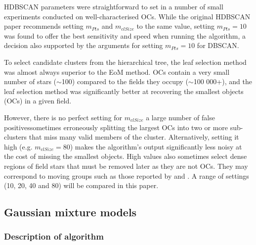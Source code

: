 HDBSCAN parameters were straightforward to set in a number of small experiments conducted on well-characterised OCs. While the original HDBSCAN paper recommends setting $m_{Pts}$ and $m_{clSize}$ to the same value, setting $m_{Pts}=10$ was found to offer the best sensitivity and speed when running the algorithm, a decision also supported by the arguments for setting $m_{Pts}=10$ for DBSCAN.

To select candidate clusters from the hierarchical tree, the leaf selection method was almost always superior to the EoM method. OCs contain a very small number of stars ($\sim$100) compared to the fields they occupy ($\sim$100 000+), and the leaf selection method was significantly better at recovering the smallest objects (OCs) in a given field.

However, there is no perfect setting for $m_{clSize}$ a large number of false positivessometimes erroneously splitting the largest OCs into two or more sub-clusters that miss many valid members of the cluster. Alternatively, setting it high (e.g. $m_{clSize}=80$) makes the algorithm's output significantly less noisy at the cost of missing the smallest objects. High values also sometimes select dense regions of field stars that must be removed later as they are not OCs.  They may correspond to moving groups such as those reported by \cite{kounkel_untangling_2019} and \cite{kounkel_untangling_2020}. A range of settings (10, 20, 40 and 80) will be compared in this paper. 




\subsection{Gaussian mixture models}

\subsubsection{Description of algorithm}

